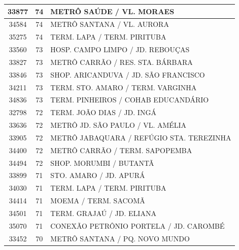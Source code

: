 \documentclass[
	12pt,				%
	oneside,			%
	a4paper,			%
	english,			%
	brazil				%
	]{abntex2ppgsi}
\begin{document}
\begin{apendicesenv}
\begin{longtable}{c|c|p{7cm}}
    33877 & 74    & METRÔ SAÚDE / VL. MORAES \\
\hline

    34584 & 74    & METRÔ SANTANA / VL. AURORA \\
\hline

    35275 & 74    & TERM. LAPA / TERM. PIRITUBA \\
\hline

    33560 & 73    & HOSP. CAMPO LIMPO / JD. REBOUÇAS \\
\hline

    33827 & 73    & METRÔ CARRÃO / RES. STA. BÁRBARA \\
\hline

    33846 & 73    & SHOP. ARICANDUVA / JD. SÃO FRANCISCO \\
\hline

    34211 & 73    & TERM. STO. AMARO / TERM. VARGINHA \\
\hline

    34836 & 73    & TERM. PINHEIROS / COHAB EDUCANDÁRIO \\
\hline

    32798 & 72    & TERM. JOÃO DIAS / JD. INGÁ \\
\hline

    33636 & 72    & METRÔ JD. SÃO PAULO / VL. AMÉLIA \\
\hline

    33905 & 72    & METRÔ JABAQUARA / REFÚGIO STA. TEREZINHA \\
\hline

    34400 & 72    & METRÔ CARRÃO / TERM. SAPOPEMBA \\
\hline

    34494 & 72    & SHOP. MORUMBI / BUTANTÃ \\
\hline

    33899 & 71    & STO. AMARO / JD. APURÁ \\
\hline

    34030 & 71    & TERM. LAPA / TERM. PIRITUBA \\
\hline

    34414 & 71    & MOEMA / TERM. SACOMÃ \\
\hline

    34501 & 71    & TERM. GRAJAÚ / JD. ELIANA \\
\hline

    35070 & 71    & CONEXÃO PETRÔNIO PORTELA / JD. CAROMBÉ \\
\hline

    33452 & 70    & METRÔ SANTANA / PQ. NOVO MUNDO \\
\hline


\end{longtable}
\end{apendicesenv}
\end{document}
